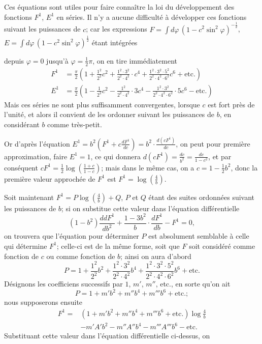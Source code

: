 \documentclass{article}
\begin{document}
Ces équations sont utiles pour faire connaître la loi du développement des fonctions $F^{1}$, $E^{1}$ en séries. Il n'y a aucune difficulté à développer ces fonctions suivant les puissances de $c$; car les expressions $F=\displaystyle\int d\varphi\,(1-c^{2}\sin^{2}\varphi)^{-\frac{1}{2}}$, $E=\displaystyle\int d\varphi\,(1-c^{2}\sin^{2}\varphi)^{\frac{1}{2}}$ étant intégrées

depuis $\varphi=0$ jusqu'à $\varphi=\frac{1}{2}\pi$, on en tire immédiatement
\[ \begin{aligned} F^{1}&=\frac{\pi}{2}\left(1+\frac{1^{2}}{2^{2}}c^{2}+\frac{1^{2}\cdot 3^{2}}{2^{2}\cdot 4^{2}}\cdot c^{4}+\frac{1^{2}\cdot 3^{2}\cdot 5^{2}}{2^{2}\cdot 4^{2}\cdot 6^{2}}c^{6}+\text{etc.}\right)\\ E^{1}&=\frac{\pi}{2}\left(1-\frac{1}{2^{2}}c^{2}-\frac{1^{2}}{2^{2}\cdot 4^{2}}\cdot 3c^{4}-\frac{1^{2}\cdot 3^{2}}{2^{2}\cdot 4^{2}\cdot 6^{2}}\cdot 5c^{6}-\text{etc.}\right) \end{aligned} \]
Mais ces séries ne sont plus suffisamment convergentes, lorsque $c$ est fort près de l'unité, et alors il convient de les ordonner suivant les puissances de $b$, en considérant $b$ comme très-petit.

Or d'après l'équation $E^{1}=b^{2}\left(F^{1}+c\frac{dF^{1}}{dc}\right)=b^{2}\cdot\frac{d(cF^{1})}{dc}$, on peut pour première approximation, faire $E^{1}=1$, ce qui donnera $d(cF^{1})=\frac{dc}{b^{2}}=\frac{dc}{1-c^{2}}$, et par conséquent $cF^{1}=\frac{1}{2}\log\left(\frac{1+c}{1-c}\right)$; mais dans le même cas, on a $c=1-\frac{1}{2}b^{2}$, donc la première valeur approchée de $F^{1}$ est $F^{1}=\log\left(\frac{4}{b}\right)$.

Soit maintenant $F^{1}=P\log\left(\frac{4}{b}\right)+Q$, $P$ et $Q$ étant des suites ordonnées suivant les puissances de $b$; si on substitue cette valeur dans l'équation différentielle
\[ (1-b^{2})\frac{ddF^{1}}{db^{2}}+\frac{1-3b^{2}}{b}\cdot\frac{dF^{1}}{db}-F^{1}=0, \]
on trouvera que l'équation pour déterminer $P$ est absolument semblable à celle qui détermine $F^{1}$; celle-ci est de la même forme, soit que $F$ soit considéré comme fonction de $c$ ou comme fonction de $b$; ainsi on aura d'abord
\[ P=1+\frac{1^{2}}{2^{2}}b^{2}+\frac{1^{2}\cdot 3^{2}}{2^{2}\cdot 4^{2}}b^{4}+\frac{1^{2}\cdot 3^{2}\cdot 5^{2}}{2^{2}\cdot 4^{2}\cdot 6^{2}}b^{6}+\text{etc.} \]
Désignons les coefficiens successifs par $1$, $m'$, $m''$, etc., en sorte qu'on ait
\[ P=1+m'b^{2}+m''b^{4}+m'''b^{6}+\text{etc.}; \]
nous supposerons ensuite
\[ \begin{aligned} F^{1}={}&(1+m'b^{2}+m''b^{4}+m'''b^{6}+\text{etc.})\log\frac{4}{b}\\ &-m'A'b^{2}-m''A''b^{4}-m'''A'''b^{6}-\text{etc.} \end{aligned} \]
Substituant cette valeur dans l'équation différentielle ci-dessus, on
\end{document}
